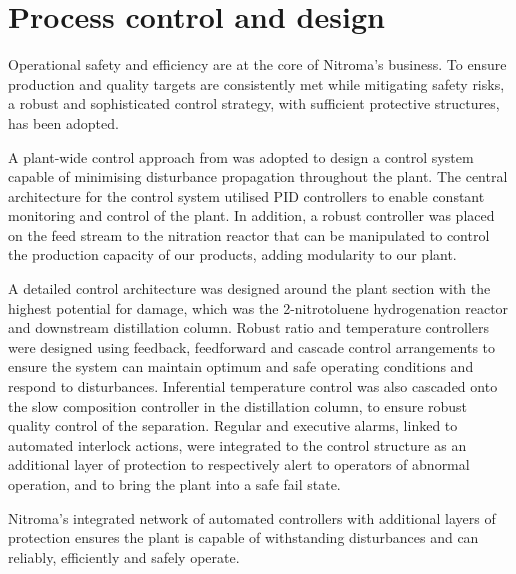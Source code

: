 \section*{Process control and design}

Operational safety and efficiency are at the core of Nitroma's business. To ensure production and quality targets are consistently met while mitigating safety risks, a robust and sophisticated control strategy, with sufficient protective structures, has been adopted.

A plant-wide control approach from \textcite{luyben_plantwide_1997} was adopted to design a control system capable of minimising disturbance propagation throughout the plant. The central architecture for the control system utilised PID controllers to enable constant monitoring and control of the plant. In addition, a robust controller was placed on the feed stream to the nitration reactor that can be manipulated to control the production capacity of our products, adding modularity to our plant.      


A detailed control architecture was designed around the plant section with the highest potential for damage, which was the 2-nitrotoluene hydrogenation reactor and downstream distillation column. Robust ratio and temperature controllers were designed using feedback, feedforward and cascade control arrangements to ensure the system can maintain optimum and safe operating conditions and respond to disturbances. Inferential temperature control was also cascaded onto the slow composition controller in the distillation column, to ensure robust quality control of the separation. Regular and executive alarms, linked to automated interlock actions, were integrated to the control structure as an additional layer of protection to respectively alert to operators of abnormal operation, and to bring the plant into a safe fail state. 

Nitroma's integrated network of automated controllers with additional layers of protection ensures the plant is capable of withstanding disturbances and can reliably, efficiently and safely operate. 



